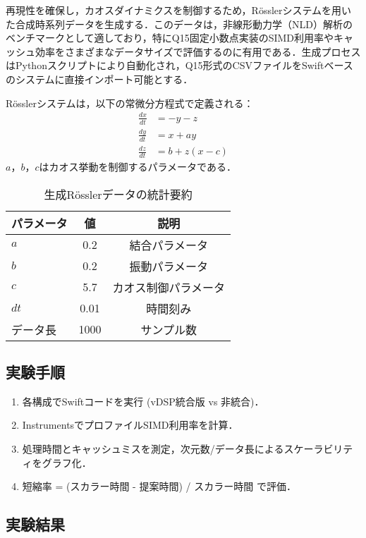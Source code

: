 \documentclass[10pt,journal,compsoc]{IEEEtran}
\begin{document}
再現性を確保し，カオスダイナミクスを制御するため，Rösslerシステムを用いた合成時系列データを生成する．このデータは，非線形動力学（NLD）解析のベンチマークとして適しており，特にQ15固定小数点実装のSIMD利用率やキャッシュ効率をさまざまなデータサイズで評価するのに有用である．生成プロセスはPythonスクリプトにより自動化され，Q15形式のCSVファイルをSwiftベースのシステムに直接インポート可能とする．

Rösslerシステムは，以下の常微分方程式で定義される：
\begin{align}
\frac{dx}{dt} &= -y - z \\
\frac{dy}{dt} &= x + ay \\
\frac{dz}{dt} &= b + z(x - c)
\end{align}
$a$，$b$，$c$はカオス挙動を制御するパラメータである．

\begin{table}[htbp]
\centering
\caption{生成Rösslerデータの統計要約}
\label{tab:rossler_stats}
\begin{tabular}{lcc}
\toprule
パラメータ & 値 & 説明 \\
\midrule
$a$ & 0.2 & 結合パラメータ \\
$b$ & 0.2 & 振動パラメータ \\
$c$ & 5.7 & カオス制御パラメータ \\
$dt$ & 0.01 & 時間刻み \\
データ長 & 1000 & サンプル数 \\
\bottomrule
\end{tabular}
\end{table}

\subsection{実験手順}

\begin{enumerate}
\item 各構成でSwiftコードを実行 (vDSP統合版 vs 非統合)．
\item InstrumentsでプロファイルSIMD利用率を計算．
\item 処理時間とキャッシュミスを測定，次元数/データ長によるスケーラビリティをグラフ化．
\item 短縮率 = (スカラー時間 - 提案時間) / スカラー時間 で評価．
\end{enumerate}

\subsection{実験結果}
\end{document}
